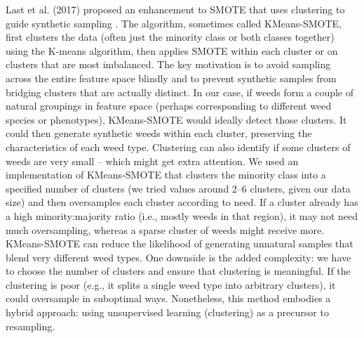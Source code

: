 \documentclass[agriengineering,article,submit,pdftex,moreauthors]{Definitions/mdpi}
\begin{document}
 Last et al. (2017) proposed an enhancement to SMOTE that uses clustering to guide synthetic sampling \cite{Last2017-rh}. The algorithm, sometimes called KMeans-SMOTE, first clusters the data (often just the minority class or both classes together) using the K-means algorithm, then applies SMOTE within each cluster or on clusters that are most imbalanced. The key motivation is to avoid sampling across the entire feature space blindly and to prevent synthetic samples from bridging clusters that are actually distinct. In our case, if weeds form a couple of natural groupings in feature space (perhaps corresponding to different weed species or phenotypes), KMeans-SMOTE would ideally detect those clusters. It could then generate synthetic weeds within each cluster, preserving the characteristics of each weed type. Clustering can also identify if some clusters of weeds are very small – which might get extra attention. We used an implementation of KMeans-SMOTE that clusters the minority class into a specified number of clusters (we tried values around 2–6 clusters, given our data size) and then oversamples each cluster according to need. If a cluster already has a high minority:majority ratio (i.e., mostly weeds in that region), it may not need much oversampling, whereas a sparse cluster of weeds might receive more. KMeans-SMOTE can reduce the likelihood of generating unnatural samples that blend very different weed types. One downside is the added complexity: we have to choose the number of clusters and ensure that clustering is meaningful. If the clustering is poor (e.g., it splits a single weed type into arbitrary clusters), it could oversample in suboptimal ways. Nonetheless, this method embodies a hybrid approach: using unsupervised learning (clustering) as a precursor to resampling.
\end{document}

